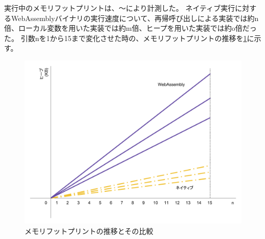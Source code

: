 実行中のメモリフットプリントは、〜により計測した。
ネイティブ実行に対するWebAssemblyバイナリの実行速度について、再帰呼び出しによる実装では約n倍、ローカル変数を用いた実装では約m倍、ヒープを用いた実装では約o倍だった。
引数nを1から15まで変化させた時の、メモリフットプリントの推移を\ref{fig:heap_size}に示す。

\begin{figure}[htbp]
  \caption{メモリフットプリントの推移とその比較}
  \label{fig:heap_size}
  \begin{center}
    \includegraphics[bb=0 0 800 600,width=12cm]{img/heap_size.pdf}
  \end{center}
\end{figure}
